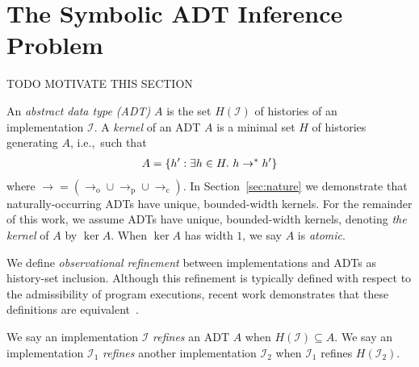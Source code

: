 \section{The Symbolic ADT Inference Problem}
\label{sec:inference}

TODO MOTIVATE THIS SECTION

An \emph{abstract data type (ADT)} $A$ is the set $H(\mathcal{I})$ of histories
of an implementation $\mathcal{I}$. A \emph{kernel} of an ADT $A$ is a minimal
set $H$ of histories generating $A$, i.e.,~such that
\begin{align*}
  A = {\{{ h' : \exists h \in H.\ h \to^\ast h' }\}}
\end{align*}
where $\to = (\to_\mathrm{o} \cup \to_\mathrm{p} \cup \to_\mathrm{c})$. In
Section~\ref{sec:nature} we demonstrate that naturally-occurring ADTs have
unique, bounded-width kernels. For the remainder of this work, we assume ADTs
have unique, bounded-width kernels, denoting \emph{the kernel} of $A$ by
$\ker A$. When $\ker A$ has width $1$, we say $A$ is \emph{atomic}.

We define \emph{observational refinement} between implementations and ADTs as
history-set inclusion. Although this refinement is typically defined with
respect to the admissibility of program executions, recent work demonstrates
that these definitions are equivalent~\cite{conf/popl/BouajjaniEEH15}.

\begin{definition}

  We say an implementation $\mathcal{I}$ \emph{refines} an ADT $A$ when
  $H(\mathcal{I}) \subseteq A$. We say an implementation $\mathcal{I}_1$
  \emph{refines} another implementation $\mathcal{I}_2$ when $\mathcal{I}_1$
  refines $H(\mathcal{I}_2)$.

\end{definition}

